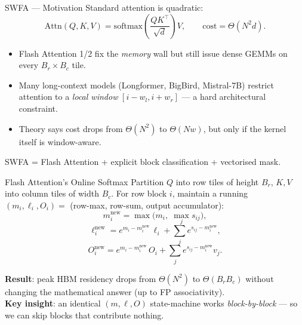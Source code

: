 \documentclass[10pt,aspectratio=169]{beamer}
\begin{document}

\begin{frame}{SWFA — Motivation}
  Standard attention is quadratic:
  \[
     \mathrm{Attn}(Q,K,V) =
     \mathrm{softmax}\!\left(\frac{QK^{\!\top}}{\sqrt{d}}\right) V,
     \qquad \text{cost} = \Theta(N^2 d).
  \]
  \vspace{-1ex}
  \begin{itemize}
    \item Flash Attention 1/2 fix the \emph{memory} wall but still
          issue dense GEMMs on every $B_r{\times}B_c$ tile.
    \item Many long-context models (Longformer, BigBird,
          Mistral-7B) restrict attention to a \emph{local window}
          $[i-w_l, i+w_r]$ — a hard architectural constraint.
    \item Theory says cost drops from $\Theta(N^2)$ to $\Theta(Nw)$,
          but only if the kernel itself is window-aware.
  \end{itemize}
  \vspace{1ex}

  \alert{SWFA = Flash Attention + explicit block classification +
         vectorised mask.}
\end{frame}

\begin{frame}{Flash Attention's Online Softmax}
  Partition $Q$ into row tiles of height $B_r$, $K,V$ into column
  tiles of width $B_c$. For row block $i$, maintain a running
  $(m_i, \ell_i, O_i) = $ (row-max, row-sum, output accumulator):
  \[
    m_i^{\text{new}} = \max\!\bigl(m_i,\; \max_j s_{ij}\bigr),
  \]
  \[
    \ell_i^{\text{new}} = e^{m_i - m_i^{\text{new}}}\,\ell_i
                          + \sum_j e^{s_{ij} - m_i^{\text{new}}},
  \]
  \[
    O_i^{\text{new}} = e^{m_i - m_i^{\text{new}}}\,O_i
                          + \sum_j e^{s_{ij} - m_i^{\text{new}}} v_j.
  \]
  \vspace{0.5ex}

  \textbf{Result}: peak HBM residency drops from $\Theta(N^2)$ to
  $\Theta(B_r B_c)$ without changing the mathematical answer (up to
  FP associativity).\\[0.5ex]
  \textbf{Key insight}: an identical $(m, \ell, O)$ state-machine
  works \emph{block-by-block} — so we can \alert{skip blocks} that
  contribute nothing.
\end{frame}
\end{document}
